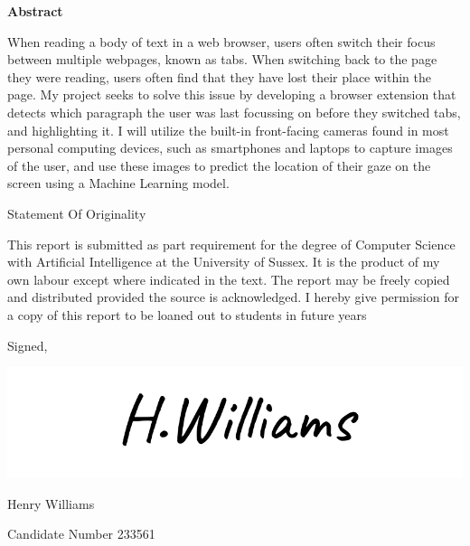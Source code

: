 \documentclass{report}
\begin{document}
\begin{titlepage}
\begin{center}
        {
            \textbf{Abstract}
        
            \vspace*{0.5cm}

            \begin{minipage}{0.5\textwidth}
                When reading a body of text in a web browser, users often switch their focus between multiple webpages, known as tabs. When switching back to the page they were reading, users often find that they have lost their place within the page. My project seeks to solve this issue by developing a browser extension that detects which paragraph the user was last focussing on before they switched tabs, and highlighting it. I will utilize the built-in front-facing cameras found in most personal computing devices, such as smartphones and laptops to capture images of the user, and use these images to predict the location of their gaze on the screen using a Machine Learning model. 
            \end{minipage}
        }
    \end{center}
\end{titlepage}

\begin{center}
    \vspace*{2cm}

    {\Huge Statement Of Originality} 

    \vspace*{1.5cm}

    \begin{minipage}{0.5\textwidth}
        This report is submitted as part requirement for the degree of Computer Science with Artificial Intelligence at the University of Sussex. It is the product of my own labour except where indicated in the text. The report may be freely copied and distributed provided the source is acknowledged. I hereby give permission for a copy of this report to be loaned out to students in future years
        
        \vspace*{0.5cm}

        Signed,
    \end{minipage}

    \includegraphics[scale=0.3]{../assets/signature.png}

    \begin{minipage}{0.5\textwidth}
        Henry Williams 

        Candidate Number 233561
    \end{minipage}
\end{center}
\end{document}
